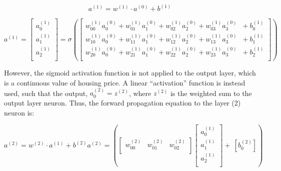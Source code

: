 \documentclass[12pt,a4paper]{article}
\begin{document}
\begin{equation}
a^{\left(1\right)}= w^{(1)} \cdot a^{(0)}+b^{(1)}
\end{equation}


\begin{equation}
a^{\left(1\right)}=\left[\begin{matrix}a_0^{\left(1\right)}\\a_1^{\left(1\right)}\\a_2^{\left(1\right)}\\\end{matrix}\right] = \sigma\left(\left[\begin{matrix}w_{00}^{\left(1\right)}a_0^{\left(0\right)}+w_{01}^{\left(1\right)}a_1^{\left(0\right)}+w_{02}^{\left(1\right)}a_2^{\left(0\right)}+w_{03}^{\left(1\right)}a_3^{\left(0\right)}\\w_{10}^{\left(1\right)}a_0^{\left(0\right)}+w_{11}^{\left(1\right)}a_1^{\left(0\right)}+w_{12}^{\left(1\right)}a_2^{\left(0\right)}+w_{13}^{\left(1\right)}a_3^{\left(0\right)}\\w_{20}^{\left(1\right)}a_0^{\left(0\right)}+w_{21}^{\left(1\right)}a_1^{\left(0\right)}+w_{22}^{\left(1\right)}a_2^{\left(0\right)}+w_{23}^{\left(1\right)}a_3^{\left(0\right)}\\\end{matrix}\begin{matrix}{+\ b}_0^{\left(1\right)}\\+\ b_1^{\left(1\right)}\\+\ b_2^{\left(1\right)}\\\end{matrix}\right]\right)
\end{equation}



However, the sigmoid activation function is not applied to the output layer, which is a continuous value of housing price. A linear “activation” function is instead used, such that the output, $a_0^{\left(2\right)}=z^{\left(2\right)}$, where $z^{\left(2\right)}$ is the weighted sum to the output layer neuron. Thus, the forward propagation equation to the layer (2) neuron is:


\begin{equation}
a^{\left(2\right)}=w^{(2)} \cdot a^{(1)}+b^{(2)}
a^{(2)} = \left(\left[\begin{matrix}w_{00}^{\left(2\right)}&w_{01}^{\left(2\right)}&w_{02}^{\left(2\right)}\\\end{matrix}\right]\left[\begin{matrix}a_0^{\left(1\right)}\\a_1^{\left(1\right)}\\a_2^{\left(1\right)}\\\end{matrix}\right]+\ \left[b_0^{\left(2\right)}\right]\right)
\end{equation}
\end{document}
